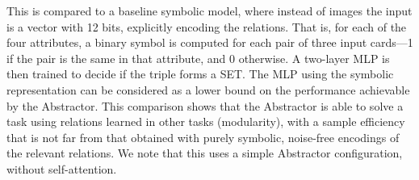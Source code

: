 This is compared to a baseline symbolic model, where instead of images the input is a vector with 12 bits, explicitly encoding the relations. That is, for each of the four attributes, a binary symbol is computed for each pair of three input cards---1 if the pair is the same in that attribute, and 0 otherwise. A two-layer MLP is then trained to decide if the triple forms a SET. The MLP using the symbolic representation can be considered as a lower bound on the performance achievable by the Abstractor. This comparison shows that the Abstractor is able to solve a task using relations learned in other tasks (modularity), with a sample efficiency that is not far from that obtained 
with purely symbolic, noise-free encodings of the relevant relations. We note that this uses a simple Abstractor configuration, without self-attention.


